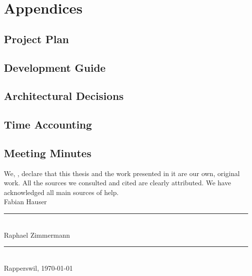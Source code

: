 \chapter{Appendices}
\setcounter{secnumdepth}{3}
\renewcommand{\thechapter}{A}
\section{Project Plan}\label{sec:project-plan}

\section{Development Guide}\label{sec:development-guide}

\section{Architectural Decisions}\label{sec:architectural-decisions}

\section{Time Accounting}\label{sec:time-accounting}

\section{Meeting Minutes}\label{sec:meeting-minutes}








\begin{declaration}
\addchaptertocentry{\authorshipname} %
\noindent We, \authorname, declare that this thesis and the work presented in it are our own, original work.  All the sources we consulted and cited are clearly attributed. We have acknowledged all main sources of help. \\

\noindent Fabian Hauser\\[2em]
\rule[0.5em]{25em}{0.5pt}\\ %
\noindent Raphael Zimmermann\\[2em]
\rule[0.5em]{25em}{0.5pt}\\ %
\noindent Rapperswil, \today
\end{declaration}

\cleardoublepage



  
